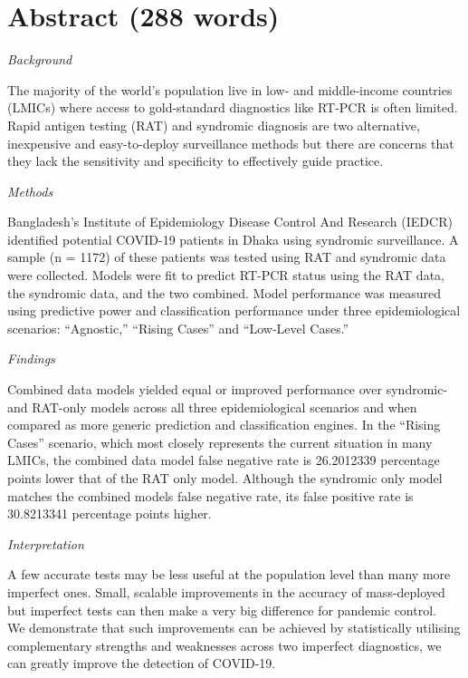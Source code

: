 \documentclass[]{elsarticle} %
\begin{document}
\hypertarget{abstract-288-words}{%
\section{Abstract (288 words)}\label{abstract-288-words}}

\emph{Background}

The majority of the world's population live in low- and middle-income countries (LMICs) where access to gold-standard diagnostics like RT-PCR is often limited.
Rapid antigen testing (RAT) and syndromic diagnosis are two alternative, inexpensive and easy-to-deploy surveillance methods but there are concerns that they lack the sensitivity and specificity to effectively guide practice.

\emph{Methods}

Bangladesh's Institute of Epidemiology Disease Control And Research (IEDCR) identified potential COVID-19 patients in Dhaka using syndromic surveillance.
A sample (n = 1172) of these patients was tested using RAT and syndromic data were collected.
Models were fit to predict RT-PCR status using the RAT data, the syndromic data, and the two combined.
Model performance was measured using predictive power and classification performance under three epidemiological scenarios: ``Agnostic,'' ``Rising Cases'' and ``Low-Level Cases.''

\emph{Findings}

Combined data models yielded equal or improved performance over syndromic- and RAT-only models across all three epidemiological scenarios and when compared as more generic prediction and classification engines.
In the ``Rising Cases'' scenario, which most closely represents the current situation in many LMICs, the combined data model false negative rate is 26.2012339 percentage points lower that of the RAT only model.
Although the syndromic only model matches the combined models false negative rate, its false positive rate is 30.8213341 percentage points higher.

\emph{Interpretation}

A few accurate tests may be less useful at the population level than many more imperfect ones.
Small, scalable improvements in the accuracy of mass-deployed but imperfect tests can then make a very big difference for pandemic control.\\
We demonstrate that such improvements can be achieved by statistically utilising complementary strengths and weaknesses across two imperfect diagnostics, we can greatly improve the detection of COVID-19.
\end{document}
